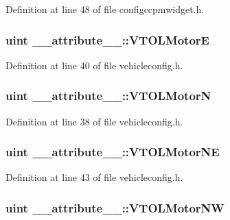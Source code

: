 \-Definition at line 48 of file configccpmwidget.\-h.

\hypertarget{group___config_plugin_ga98abc446e1dcba498787f381659f6b2d}{
\subsubsection[{\-V\-T\-O\-L\-Motor\-E}]{\setlength{\rightskip}{0pt plus 5cm}uint {\bf \-\_\-\-\_\-attribute\-\_\-\-\_\-\-::\-V\-T\-O\-L\-Motor\-E}}}\label{group___config_plugin_ga98abc446e1dcba498787f381659f6b2d}


\-Definition at line 40 of file vehicleconfig.\-h.

\hypertarget{group___config_plugin_ga2f7517413dcc58e5033f5b558c2645b6}{
\subsubsection[{\-V\-T\-O\-L\-Motor\-N}]{\setlength{\rightskip}{0pt plus 5cm}uint {\bf \-\_\-\-\_\-attribute\-\_\-\-\_\-\-::\-V\-T\-O\-L\-Motor\-N}}}\label{group___config_plugin_ga2f7517413dcc58e5033f5b558c2645b6}


\-Definition at line 38 of file vehicleconfig.\-h.

\hypertarget{group___config_plugin_gab2efff1f0b5cdb98443f986d78f75691}{
\subsubsection[{\-V\-T\-O\-L\-Motor\-N\-E}]{\setlength{\rightskip}{0pt plus 5cm}uint {\bf \-\_\-\-\_\-attribute\-\_\-\-\_\-\-::\-V\-T\-O\-L\-Motor\-N\-E}}}\label{group___config_plugin_gab2efff1f0b5cdb98443f986d78f75691}


\-Definition at line 43 of file vehicleconfig.\-h.

\hypertarget{group___config_plugin_gaad074461234c2de58881eb8f2923e6e7}{
\subsubsection[{\-V\-T\-O\-L\-Motor\-N\-W}]{\setlength{\rightskip}{0pt plus 5cm}uint {\bf \-\_\-\-\_\-attribute\-\_\-\-\_\-\-::\-V\-T\-O\-L\-Motor\-N\-W}}}\label{group___config_plugin_gaad074461234c2de58881eb8f2923e6e7}


